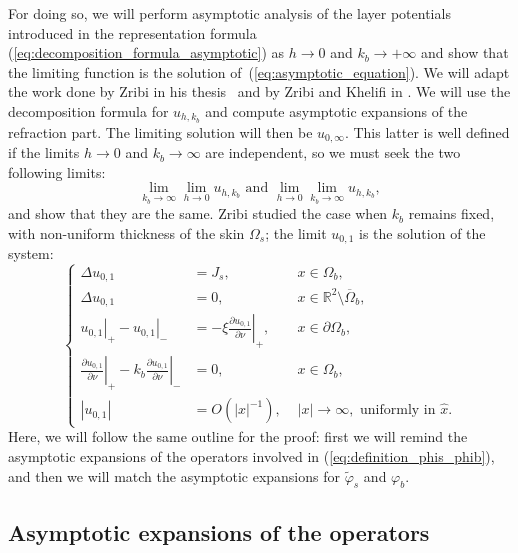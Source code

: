 For doing so, we will perform asymptotic analysis of the layer
potentials introduced in the representation formula
(\ref{eq:decomposition_formula_asymptotic}) as $h \rightarrow
0$ and $k_b\rightarrow +\infty$ and show that the limiting
function is the solution of~(\ref{eq:asymptotic_equation}). We
will adapt the work done by Zribi in his thesis~\cite{zribilayer}
and by Zribi and Khelifi in \cite{khelifizribi2011asymptotic}. We will use the
decomposition formula for $u_{h,k_{b}}$ and compute
asymptotic expansions of the refraction part. The limiting
solution will then be $u_{0,\infty}$. This latter is well defined
if the limits $h\rightarrow0$ and $k_{b}\rightarrow\infty$
are independent, so we must seek the two following limits:
\[
\lim_{k_{b}\rightarrow\infty}\lim_{h\rightarrow0}u_{h,k_{b}}\mbox{ and }\lim_{h\rightarrow0}\lim_{k_{b}\rightarrow\infty}u_{h,k_{b}},
\]
 and show that they are the same. Zribi \cite[chapter 3]{zribilayer}
studied the case when $k_{b}$ remains fixed, with non-uniform
thickness of the skin $\Omega_{s}$; the limit $u_{0,1}$ is the
solution of the system:
\begin{equation}
\left\{ \begin{alignedat}{2}\Delta u_{0,1} & ={J_s}, & \,\, x\in\Omega_{b},\\
\Delta u_{0,1} & =0, & \,\, x\in\mathbb{R}^{2}\setminus\overline{\Omega}_{b},\\
\left.u_{0,1}\right|_{+}-\left.u_{0,1}\right|_{-} & =-\xi\left.\frac{\partial u_{0,1}}{\partial\nu}\right|_{+}, & \,\, x\in\partial\Omega_{b},\\
\left.\frac{\partial u_{0,1}}{\partial\nu}\right|_{+}-k_{b}\left.\frac{\partial u_{0,1}}{\partial\nu}\right|_{-} & =0, & \,\, x\in\Omega_{b},\\
\left|u_{0,1}\right| & = {O}(\left|x\right|^{-1}), &
\,\,\left|x\right|\rightarrow\infty,\text{ uniformly in }\hat{x}.
\end{alignedat}
\right.\label{eq:asymptotic_equation_zribi}
\end{equation}
 Here, we will follow the same outline for the proof: first we will
remind the asymptotic expansions of the operators involved in
(\ref{eq:definition_phis_phib}), and then we will match the
asymptotic expansions for $\tilde{\varphi}_{s}$ and $\varphi_{b}$.


\subsection{Asymptotic expansions of the operators}

